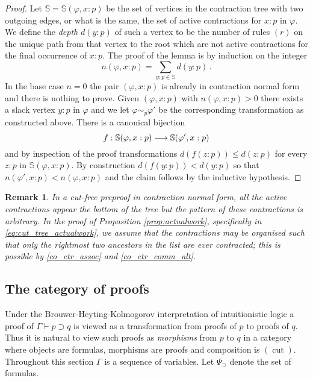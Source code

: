 \documentclass[english,letter paper,12pt,leqno]{article}
\theoremstyle{example}
\newtheorem{remark}[theorem]{Remark}
\numberwithin{equation}{section}
\def\imp{\supset}
\begin{document}
\begin{proof}
Let $\mathbb{S} = \mathbb{S}(\varphi, x:p)$ be the set of vertices in the contraction tree with two outgoing edges, or what is the same, the set of active contractions for $x:p$ in $\varphi$. We define the \emph{depth} $d(y:p)$ of such a vertex to be the number of rules $(r)$ on the unique path from that vertex to the root which are not active contractions for the final occurrence of $x:p$. The proof of the lemma is by induction on the integer
\[
n(\varphi,x:p) = \sum_{y:p \in \mathbb{S}} d(y:p)\,.
\]
In the base case $n = 0$ the pair $(\varphi, x:p)$ is already in contraction normal form and there is nothing to prove. Given $(\varphi,x:p)$ with $n(\varphi,x:p) > 0$ there exists a slack vertex $y:p$ in $\varphi$ and we let $\varphi \sim_p \varphi'$ be the corresponding transformation as constructed above. There is a canonical bijection
\[
f: \mathbb{S}(\varphi, x:p) \longrightarrow \mathbb{S}(\varphi', x:p)
\]
and by inspection of the proof transformations $d( f(z:p) ) \le d(z:p)$ for every $z:p$ in $\mathbb{S}(\varphi,x:p)$. By construction $d( f(y:p) ) < d(y:p)$ so that $n(\varphi',x:p) < n(\varphi,x:p)$ and the claim follows by the inductive hypothesis.
\end{proof}

\begin{remark}\label{remark:coassoc_tree} In a cut-free preproof in contraction normal form, all the active contractions appear the bottom of the tree but the pattern of these contractions is arbitrary. In the proof of Proposition \ref{prop:actualwork}, specifically in \eqref{eq:cut_tree_actualwork}, we assume that the contractions may be organised such that only the rightmost two ancestors in the list are ever contracted; this is possible by \eqref{co_ctr_assoc} and \eqref{co_ctr_comm_alt}.
\end{remark}

\subsection{The category of proofs}
\label{categoryofproofs}

Under the Brouwer-Heyting-Kolmogorov interpretation of intuitionistic logic \cite{troelstra} a proof of $\Gamma \vdash p \imp q$ is viewed as a transformation from proofs of $p$ to proofs of $q$. Thus it is natural to view such proofs as \emph{morphisms} from $p$ to $q$ in a category where objects are formulas, morphisms are proofs and composition is $(\operatorname{cut})$. Throughout this section $\Gamma$ is a sequence of variables. Let $\Psi_{\imp}$ denote the set of formulas.
\end{document}
